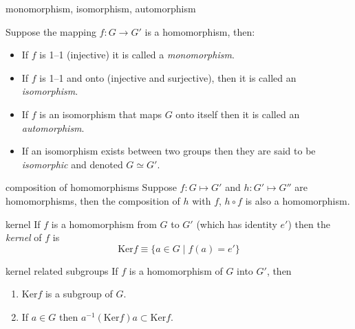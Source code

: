 \documentclass[avery5371,grid]{flashcards}
\begin{document}
\begin{flashcard}[Definition]{monomorphism, isomorphism, automorphism}
\begin{small}
Suppose the mapping $f: G\rightarrow G'$ is a homomorphism, then:
\begin{itemize}
\item If $f$ is 1--1 (injective) it is called a \textit{monomorphism}.
\item If $f$ is 1--1 and onto (injective and surjective), then it is called an \mbox{\textit{isomorphism}}.
\item If $f$ is an isomorphism that maps $G$ onto itself then it is called
an \textit{automorphism}.
\item If an isomorphism exists between two groups then they are said to be
\textit{isomorphic} and denoted $G\simeq G'$.
\end{itemize}
\end{small}
\end{flashcard}

\begin{flashcard}[Theorem]{composition of homomorphisms}
Suppose $f : G \mapsto G'$ and $h : G' \mapsto G''$ are homomorphisms,
then the composition of $h$ with $f$, $h\circ f$ is also a homomorphism.
\end{flashcard}

\begin{flashcard}[Definition]{kernel}
If $f$ is a homomorphism from $G$ to $G'$ (which has identity $e'$) then the \textit{kernel}
of $f$ is
\begin{equation*}
\textrm{Ker}f \equiv \lbrace a \in G \mid f(a)=e' \rbrace
\end{equation*}
\end{flashcard}

\begin{flashcard}[Theorem]{kernel related subgroups}
If $f$ is a homomorphism of $G$ into $G'$, then
\begin{enumerate}
\item $\textrm{Ker} f$ is a subgroup of $G$.
\item If $a \in G$ then $a^{-1}(\textrm{Ker} f) a \subset \textrm{Ker} f$.
\end{enumerate}
\end{flashcard}
\end{document}
